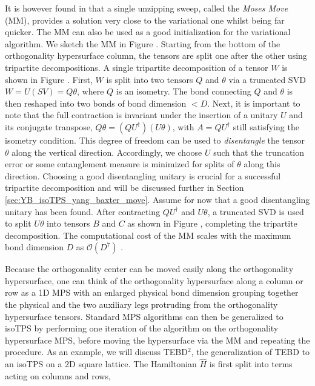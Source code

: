 It is however found in \cite{cite:isometric_tensor_network_states_in_two_dimensions} that a single unzipping sweep, called the \textit{Moses Move} (MM), provides a solution very close to the variational one whilst being far quicker. The MM can also be used as a good initialization for the variational algorithm. We sketch the MM in Figure . Starting from the bottom of the orthogonality hypersurface column, the tensors are split one after the other using tripartite decompositions. A single tripartite decomposition of a tensor $W$ is shown in Figure . First, $W$ is split into two tensors $Q$ and $\theta$ via a truncated SVD $W = U(SV) = Q\theta$, where $Q$ is an isometry. The bond connecting $Q$ and $\theta$ is then reshaped into two bonds of bond dimension $<D$. Next, it is important to note that the full contraction is invariant under the insertion of a unitary $U$ and its conjugate transpose, $Q\theta = (QU^\dagger)(U\theta)$, with $A = QU^\dagger$ still satisfying the isometry condition. This degree of freedom can be used to \textit{disentangle} the tensor $\theta$ along the vertical direction. Accordingly, we choose $U$ such that the truncation error or some entanglement measure is minimized for splits of $\theta$ along this direction. Choosing a good disentangling unitary is crucial for a successful tripartite decomposition and will be discussed further in Section \ref{sec:YB_isoTPS_yang_baxter_move}. Assume for now that a good disentangling unitary has been found. After contracting $QU^\dagger$ and $U\theta$, a truncated SVD is used to split $U\theta$ into tensors $B$ and $C$ as shown in Figure , completing the tripartite decomposition. The computational cost of the MM scales with the maximum bond dimension $D$ as $\mathcal{O}(D^7)$ \cite{cite:isometric_tensor_network_states_in_two_dimensions, cite:efficient_simulation_of_dynamics_in_two_dimensional_quantum_spin_systems}.\par
Because the orthogonality center can be moved easily along the orthogonality hypersurface, one can think of the orthogonality hypersurface along a column or row as a 1D MPS with an enlarged physical bond dimension grouping together the physical and the two auxiliary legs protruding from the orthogonality hypersurface tensors. Standard MPS algorithms can then be generalized to isoTPS by performing one iteration of the algorithm on the orthogonality hypersurface MPS, before moving the hypersurface via the MM and repeating the procedure. As an example, we will discuss TEBD$^2$, the generalization of TEBD to an isoTPS on a 2D square lattice. The Hamiltonian $\hat{H}$ is first split into terms acting on columns and rows,
